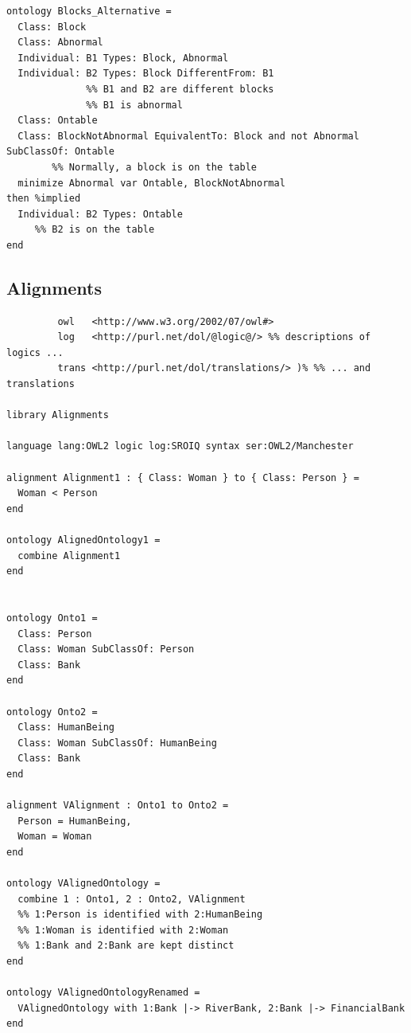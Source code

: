 \documentclass[10pt,%
\ifpretendfinal
final%
\else
draft%
\fi,
]{scrreprt}
\newcommand{\ssclause}[1]{\subsection{#1}}
\begin{document}
 
  \begin{lstlisting}[language=dolText,morekeywords={forall,if,not,circ,var,Class,Individual,EquivalentTo,and,SubClassOf}]
ontology Blocks_Alternative =
  Class: Block
  Class: Abnormal
  Individual: B1 Types: Block, Abnormal
  Individual: B2 Types: Block DifferentFrom: B1
              %% B1 and B2 are different blocks
              %% B1 is abnormal
  Class: Ontable 
  Class: BlockNotAbnormal EquivalentTo: Block and not Abnormal SubClassOf: Ontable 
        %% Normally, a block is on the table
  minimize Abnormal var Ontable, BlockNotAbnormal
then %implied
  Individual: B2 Types: Ontable
     %% B2 is on the table
end
  \end{lstlisting}

\ssclause{Alignments}

\begin{lstlisting}[basicstyle=\ttfamily,language=dolText,morekeywords={props,ObjectProperty,Class,DisjointUnionOf,SubClassOf,Characteristics,Transitive,Asymmetric,SubPropertyOf,DisjointClasses,EquivalentTo,inverse,only,forall,iff,if,or,exists,bridge,distributed},escapechar=@,mathescape]
%prefix( :     <http://www.example.org/alignment#>
         owl   <http://www.w3.org/2002/07/owl#>
         log   <http://purl.net/dol/@logic@/> %% descriptions of logics ...
         trans <http://purl.net/dol/translations/> )% %% ... and translations

library Alignments

language lang:OWL2 logic log:SROIQ syntax ser:OWL2/Manchester

alignment Alignment1 : { Class: Woman } to { Class: Person } =
  Woman < Person
end

ontology AlignedOntology1 =
  combine Alignment1
end


ontology Onto1 =
  Class: Person
  Class: Woman SubClassOf: Person
  Class: Bank
end

ontology Onto2 =
  Class: HumanBeing
  Class: Woman SubClassOf: HumanBeing
  Class: Bank
end

alignment VAlignment : Onto1 to Onto2 =
  Person = HumanBeing,
  Woman = Woman
end

ontology VAlignedOntology =
  combine 1 : Onto1, 2 : Onto2, VAlignment
  %% 1:Person is identified with 2:HumanBeing
  %% 1:Woman is identified with 2:Woman
  %% 1:Bank and 2:Bank are kept distinct
end

ontology VAlignedOntologyRenamed =
  VAlignedOntology with 1:Bank |-> RiverBank, 2:Bank |-> FinancialBank
end

\end{lstlisting}
\end{document}
